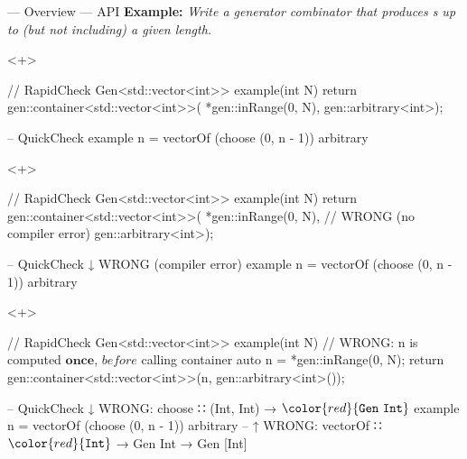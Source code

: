 \begin{frame}[fragile,t]{\halcheck{} --- Overview --- API}
  \textbf{Example:} \emph{Write a generator combinator that produces s up to (but not including) a given length.}

  \begin{onlyenv}<+>
    \begin{cppcode}
      // RapidCheck
      Gen<std::vector<int>> example(int N) {
        return gen::container<std::vector<int>>(
          *gen::inRange(0, N),
          gen::arbitrary<int>);
      }
    \end{cppcode}

    \begin{haskellcode}
      -- QuickCheck
      example n = vectorOf (choose (0, n - 1)) arbitrary
    \end{haskellcode}
  \end{onlyenv}

  \begin{onlyenv}<+>
    \begin{cppcode}
      // RapidCheck
      Gen<std::vector<int>> example(int N) {
        return gen::container<std::vector<int>>(
          *gen::inRange(0, N), // WRONG (no compiler error)
          gen::arbitrary<int>);
      }
    \end{cppcode}

    \begin{haskellcode}
      -- QuickCheck         ↓ WRONG (compiler error)
      example n = vectorOf (choose (0, n - 1)) arbitrary
    \end{haskellcode}
  \end{onlyenv}

  \begin{onlyenv}<+>
    \begin{cppcode}
      // RapidCheck
      Gen<std::vector<int>> example(int N) {
        // WRONG: n is computed $\mathbf{once}$, $\mathit{before}$ calling container
        auto n = *gen::inRange(0, N);
        return gen::container<std::vector<int>>(n, gen::arbitrary<int>());
      }
    \end{cppcode}
    \begin{haskellcode}
      -- QuickCheck         ↓ WRONG: choose ∷ (Int, Int) → $\color{red}{\mathtt{Gen\ Int}}$
      example n = vectorOf (choose (0, n - 1)) arbitrary
      --          ↑ WRONG: vectorOf ∷ $\color{red}{\mathtt{Int}}$ → Gen Int → Gen [Int]
    \end{haskellcode}
  \end{onlyenv}


\end{frame}
